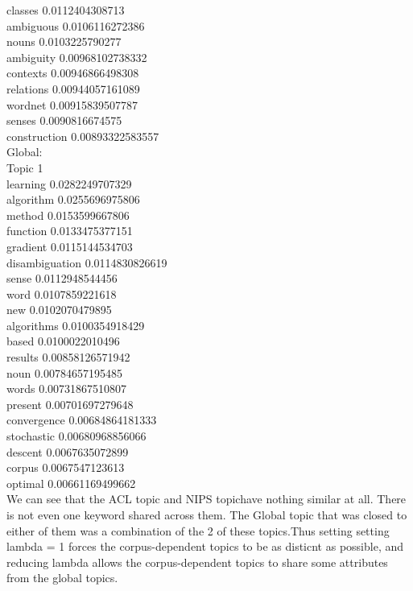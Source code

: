 \documentclass{article}
\begin{document}
classes 0.0112404308713\\
ambiguous 0.0106116272386\\
nouns 0.0103225790277\\
ambiguity 0.00968102738332\\
contexts 0.00946866498308\\
relations 0.00944057161089\\
wordnet 0.00915839507787\\
senses 0.0090816674575\\
construction 0.00893322583557\\
Global:\\
Topic 1\\
learning 0.0282249707329\\
algorithm 0.0255696975806\\
method 0.0153599667806\\
function 0.0133475377151\\
gradient 0.0115144534703\\
disambiguation 0.0114830826619\\
sense 0.0112948544456\\
word 0.0107859221618\\
new 0.0102070479895\\
algorithms 0.0100354918429\\
based 0.0100022010496\\
results 0.00858126571942\\
noun 0.00784657195485\\
words 0.00731867510807\\
present 0.00701697279648\\
convergence 0.00684864181333\\
stochastic 0.00680968856066\\
descent 0.0067635072899\\
corpus 0.0067547123613\\
optimal 0.00661169499662\\

We can see that the ACL topic and NIPS topichave nothing similar at all. There is not even one keyword shared across them. The Global topic that was closed to either of them was a combination of the 2 of these topics.Thus setting setting lambda = 1 forces the corpus-dependent topics to be as disticnt as possible, and reducing lambda allows the corpus-dependent topics to share some attributes from the global topics.
\end{document}
